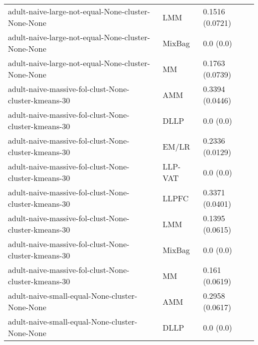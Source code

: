 \begin{longtable}{lll}
                                                           adult-naive-large-not-equal-None-cluster-None-None &       LMM &                           0.1516 (0.0721) \\
                                                           adult-naive-large-not-equal-None-cluster-None-None &    MixBag &                                 0.0 (0.0) \\
                                                           adult-naive-large-not-equal-None-cluster-None-None &        MM &                           0.1763 (0.0739) \\
                                                         adult-naive-massive-fol-clust-None-cluster-kmeans-30 &       AMM &                           0.3394 (0.0446) \\
                                                         adult-naive-massive-fol-clust-None-cluster-kmeans-30 &      DLLP &                                 0.0 (0.0) \\
                                                         adult-naive-massive-fol-clust-None-cluster-kmeans-30 &     EM/LR &                           0.2336 (0.0129) \\
                                                         adult-naive-massive-fol-clust-None-cluster-kmeans-30 &   LLP-VAT &                                 0.0 (0.0) \\
                                                         adult-naive-massive-fol-clust-None-cluster-kmeans-30 &     LLPFC &                           0.3371 (0.0401) \\
                                                         adult-naive-massive-fol-clust-None-cluster-kmeans-30 &       LMM &                           0.1395 (0.0615) \\
                                                         adult-naive-massive-fol-clust-None-cluster-kmeans-30 &    MixBag &                                 0.0 (0.0) \\
                                                         adult-naive-massive-fol-clust-None-cluster-kmeans-30 &        MM &                            0.161 (0.0619) \\
                                                               adult-naive-small-equal-None-cluster-None-None &       AMM &                           0.2958 (0.0617) \\
                                                               adult-naive-small-equal-None-cluster-None-None &      DLLP &                                 0.0 (0.0) \\

\end{longtable}
